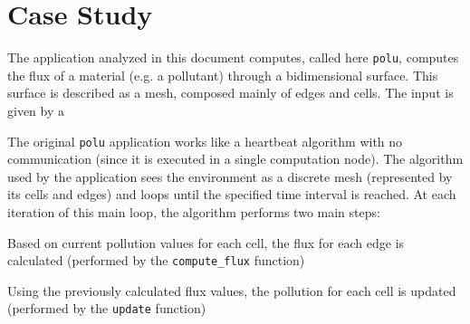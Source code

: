 \section{Case Study}

The application analyzed in this document computes, called here \texttt{polu}, computes the flux of a material (e.g. a pollutant) through a bidimensional surface. This surface is described as a mesh, composed mainly of edges and cells. The input is given by a 

The original \texttt{polu} application works like a heartbeat algorithm with no communication (since it is executed in a single computation node). The algorithm used by the application sees the environment as a discrete mesh (represented by its cells and edges) and loops until the specified time interval is reached. At each iteration of this main loop, the algorithm performs two main steps:

\begin{description}
	\item[Flux Computation] Based on current pollution values for each cell, the flux for each edge is calculated (performed by the \texttt{compute\_flux} function)
	\item[Pollution Update] Using the previously calculated flux values, the pollution for each cell is updated (performed by the \texttt{update} function)
\end{description}




